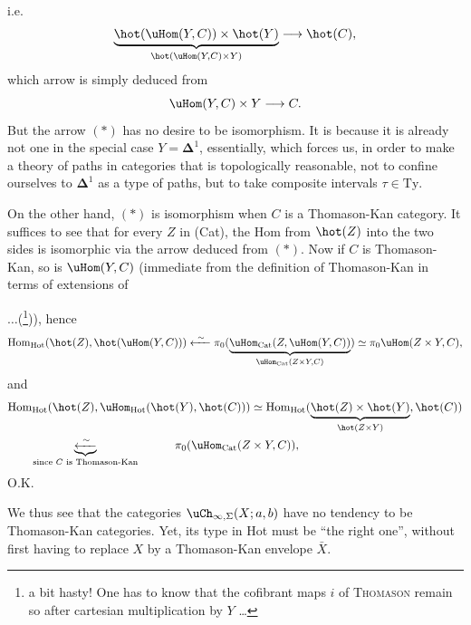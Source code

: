 
i.e.
\[
\underbrace{\hot(\uHom(Y,C))\times\hot(Y)}_{\hot(\uHom(Y,C)\times Y)}\longrightarrow\hot(C),
\]
which arrow is simply deduced from
\[
\uHom(Y,C)\times Y\longrightarrow C.
\]
But the arrow $(*)$ has no desire to be isomorphism. It is because it is already not one in the special case $Y=\mathbf{\Delta}^1$, essentially, which forces us, in order to make a theory of paths in categories that is topologically reasonable, not to confine ourselves to $\mathbf{\Delta}^1$ as a type of paths, but to take composite intervals $\tau\in\mathrm{Ty}$.


On the other hand, $(*)$ is isomorphism when $C$ is a Thomason-Kan category. It suffices to see that for every $Z$ in (Cat), the Hom from $\hot(Z)$ into the two sides is isomorphic via the arrow deduced from $(*)$. Now if $C$ is Thomason-Kan, so is $\uHom(Y,C)$ (immediate from the definition of Thomason-Kan in terms of extensions of
$\ldots$(\footnote[29]{a bit hasty! One has to know that the cofibrant maps $i$ of \textsc{Thomason} remain so after cartesian multiplication by $Y$ \ldots})), hence
\[
\mathrm{Hom}_{\mathrm{Hot}}(\hot(Z),\hot(\uHom(Y,C)))\xleftarrow{\ \sim\ }\pi_0(\underbrace{\uHom_{\mathrm{Cat}}(Z,\uHom(Y,C))}_{\uHom_{\mathrm{Cat}}(Z\times Y,C)})\simeq\pi_0\uHom(Z\times Y,C), %
\]
and
\[
\begin{aligned}
&\mathrm{Hom}_{\mathrm{Hot}}(\hot(Z),\uHom_{\mathrm{Hot}}(\hot(Y),\hot(C)))\simeq\mathrm{Hom}_{\mathrm{Hot}}(\underbrace{\hot(Z)\times\hot(Y)}_{\hot(Z\times Y)},\hot(C))\\
&\qquad\underbrace{\xleftarrow{\ \sim\ }}_{\text{since $C$ is Thomason-Kan}}\qquad\quad\pi_0(\uHom_{\mathrm{Cat}}(Z\times Y,C)),
\end{aligned}
\]
O.K.

We thus see that the categories $\uCh_{\infty,\Sigma}(X;a,b)$ have no tendency to be Thomason-Kan categories. Yet, its type in Hot must be ``the right one'', without first having to replace $X$ by a Thomason-Kan envelope $\bar{X}$.



